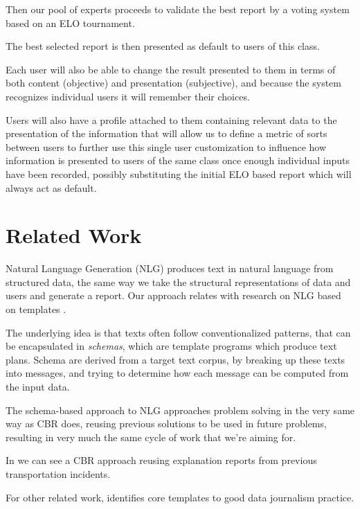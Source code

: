 Then our pool of experts proceeds to validate the best report by a voting system based on an ELO tournament. 

The best selected report is then presented as default to users of this class. 

Each user will also be able to change the result presented to them in terms of both content (objective) and presentation (subjective), and because the system recognizes individual users it will remember their choices.

Users will also have a profile attached to them containing relevant data to the presentation of the information that will allow us to define a metric of sorts between users to further use this single user customization to influence how information is presented to users of the same class once enough individual inputs have been recorded, possibly substituting the initial ELO based report which will always act as default.

\section{Related Work}
\label{cap1:sec:relatedwork}

Natural Language Generation (NLG) produces text in natural language from structured data, the same way we take the structural representations of data and users and generate a report.
Our approach relates with research on NLG  based on templates \cite{McKeown}.

The underlying idea is that texts often follow conventionalized patterns, that can be encapsulated in {\it schemas}, which are template programs which produce text plans. 
Schema are derived from a target text corpus, by breaking up these texts into messages, and trying to determine how each message can be computed from the input data. 

The schema-based approach to NLG approaches problem solving in the very same way as CBR does, reusing previous solutions to be used in future problems, resulting in very much the same cycle of work that we're aiming for.

In \cite{sizov2017} we can see a CBR approach reusing explanation reports from previous transportation incidents.

For other related work, \cite{Adegboyega2017} identifies core templates to good data journalism practice.

